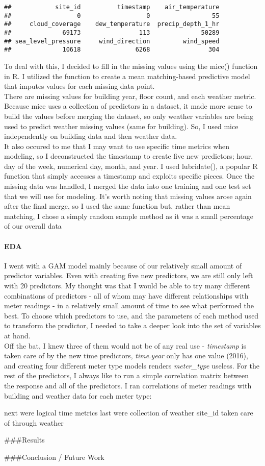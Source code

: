 \documentclass[]{article}
\let\oldparagraph\paragraph
\renewcommand{\paragraph}[1]{\oldparagraph{#1}\mbox{}}
\begin{document}
\begin{verbatim}
##            site_id          timestamp    air_temperature 
##                  0                  0                 55 
##     cloud_coverage    dew_temperature  precip_depth_1_hr 
##              69173                113              50289 
## sea_level_pressure     wind_direction         wind_speed 
##              10618               6268                304
\end{verbatim}

To deal with this, I decided to fill in the missing values using the
mice() function in R. I utilized the function to create a mean
matching-based predictive model that imputes values for each missing
data point.\\
There are missing values for building year, floor count, and each
weather metric. Because mice uses a collection of predictors in a
dataset, it made more sense to build the values before merging the
dataset, so only weather variables are being used to predict weather
missing values (same for building). So, I used mice independently on
building data and then weather data.\\
It also occured to me that I may want to use specific time metrics when
modeling, so I deconstructed the timestamp to create five new
predictors; hour, day of the week, numerical day, month, and year. I
used lubridate(), a popular R function that simply accesses a timestamp
and exploits specific pieces. Once the missing data was handled, I
merged the data into one training and one test set that we will use for
modeling. It's worth noting that missing values arose again after the
final merge, so I used the same function but, rather than mean matching,
I chose a simply random sample method as it was a small percentage of
our overall data

\hypertarget{eda}{%
\paragraph{EDA}\label{eda}}

I went with a GAM model mainly because of our relatively small amount of
predictor variables. Even with creating five new predictors, we are
still only left with 20 predictors. My thought was that I would be able
to try many different combinations of predictors - all of whom may have
different relationships with meter readings - in a relatively small
amount of time to see what performed the best. To choose which
predictors to use, and the parameters of each method used to transform
the predictor, I needed to take a deeper look into the set of variables
at hand.\\
Off the bat, I knew three of them would not be of any real use -
\emph{timestamp} is taken care of by the new time predictors,
\emph{time.year} only has one value (2016), and creating four different
meter type models renders \emph{meter\_type} useless. For the rest of
the predictors, I always like to run a simple correlation matrix between
the response and all of the predictors. I ran correlations of meter
readings with building and weather data for each meter type:

next were logical time metrics last were collection of weather site\_id
taken care of through weather

\#\#\#Results

\#\#\#Conclusion / Future Work
\end{document}
